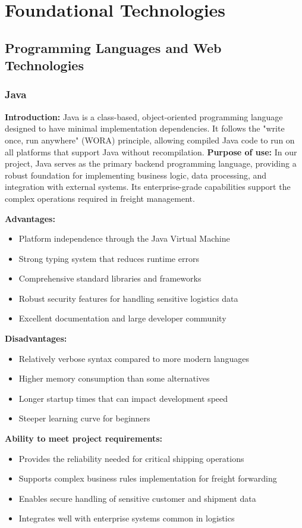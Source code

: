 \section{Foundational Technologies}
\subsection{Programming Languages and Web Technologies}
\subsubsection{Java}
\textbf{Introduction:} Java \cite{java-definition} is a class-based, object-oriented programming language designed to have minimal implementation dependencies. It follows the "write once, run anywhere" (WORA) principle, allowing compiled Java code to run on all platforms that support Java without recompilation.
\textbf{Purpose of use:} In our project, Java serves as the primary backend programming language, providing a robust foundation for implementing business logic, data processing, and integration with external systems. Its enterprise-grade capabilities support the complex operations required in freight management.

\textbf{Advantages:}
\begin{itemize}
    \item Platform independence through the Java Virtual Machine
    \item Strong typing system that reduces runtime errors
    \item Comprehensive standard libraries and frameworks
    \item Robust security features for handling sensitive logistics data
    \item Excellent documentation and large developer community
\end{itemize}

\textbf{Disadvantages:}
\begin{itemize}
    \item Relatively verbose syntax compared to more modern languages
    \item Higher memory consumption than some alternatives
    \item Longer startup times that can impact development speed
    \item Steeper learning curve for beginners
\end{itemize}

\textbf{Ability to meet project requirements:}
\begin{itemize}
    \item Provides the reliability needed for critical shipping operations
    \item Supports complex business rules implementation for freight forwarding
    \item Enables secure handling of sensitive customer and shipment data
    \item Integrates well with enterprise systems common in logistics
\end{itemize}


